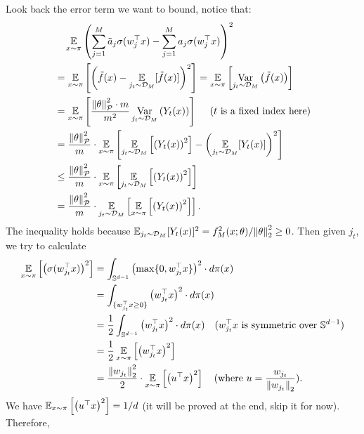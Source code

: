 \begin{answer}
    Look back the error term we want to bound, notice that:
    \begin{align*}
        &\quad \operatorname*{\mathbb{E}}_{x \sim \pi} \left( \sum_{j=1}^M \tilde{a}_j \sigma(w_j^{\top} x) - \sum_{j=1}^M a_j \sigma(w_j^{\top} x) \right)^2  \\
        &= \operatorname*{\mathbb{E}}_{x \sim \pi} \left[\left(\tilde{f}(x) - \operatorname*{\mathbb{E}}_{j_t \sim \mathcal{D}_M}[\tilde{f}(x)]\right)^2\right] = \operatorname*{\mathbb{E}}_{x \sim \pi} \left[\operatorname*{Var}_{j_t \sim \mathcal{D}_M}\left( \tilde{f}(x) \right)\right] \\
        &= \operatorname*{\mathbb{E}}_{x\sim \pi} \left[\frac{\norm{\theta}_\mathcal{P}^2 \cdot m}{m^2} \operatorname*{Var}_{j_t \sim \mathcal{D}_M}\left(Y_t(x)\right)\right] \quad \text{ ($t$ is a fixed index here)} \\
        &= \frac{\norm{\theta}_{\mathcal{P}}^2}{m} \cdot \operatorname*{\mathbb{E}}_{x\sim \pi} \left[\operatorname*{\mathbb{E}}_{j_t\sim \mathcal{D}_M}\left[\left(Y_t(x)\right)^2\right] - \left(\operatorname*{\mathbb{E}}_{j_t\sim \mathcal{D}_M} [Y_t(x)]\right)^2\right] \\
        &\le \frac{\norm{\theta}_{\mathcal{P}}^2}{m} \cdot \operatorname*{\mathbb{E}}_{x\sim \pi} \left[\operatorname*{\mathbb{E}}_{j_t\sim \mathcal{D}_M}\left[\left(Y_t(x)\right)^2\right]\right]  \\
        &= \frac{\norm{\theta}_{\mathcal{P}}^2}{m} \cdot  \operatorname*{\mathbb{E}}_{j_t\sim \mathcal{D}_M}\left[\operatorname*{\mathbb{E}}_{x\sim \pi}\left[\left(Y_t(x)\right)^2\right]\right].
    \end{align*}
    The inequality holds because $\operatorname*{\mathbb{E}}_{j_t\sim \mathcal{D}_M} [Y_t(x)]^2 = f^2_M(x; \theta) / \norm{\theta}_2^2 \ge 0$.
    Then given $j_t$, we try to calculate 
    \begin{align*}
        \operatorname*{\mathbb{E}}_{x\sim \pi}\left[\left(\sigma(w_{j_t}^\top x)\right)^2\right] &= \int_{\mathbb{S}^{d-1}} \left(\max\{0, w_{j_t}^\top x\}\right)^2 \cdot d\pi(x) \\
        &= \int_{\{w_{j_t}^\top x \ge 0\}} \left(w_{j_t}^\top x\right)^2 \cdot d\pi(x) \\
        &= \frac{1}{2} \int_{\mathbb{S}^{d-1}} \left(w_{j_t}^\top x\right)^2 \cdot d\pi(x) \quad \text{($w_{j_t}^\top x$ is symmetric over $\mathbb{S}^{d-1}$)} \\
        &= \frac{1}{2} \operatorname*{\mathbb{E}}_{x\sim \pi} \left[\left(w_{j_t}^\top x\right)^2\right] \\
        &= \frac{\norm{w_{j_t}}_2^2}{2} \cdot \operatorname*{\mathbb{E}}_{x\sim \pi} \left[\left(u^\top x\right)^2\right] \quad \text{(where $u = \frac{w_{j_t}}{\norm{w_{j_t}}_2}$)}.
    \end{align*}
    We have $\operatorname*{\mathbb{E}}_{x\sim \pi} \left[\left(u^\top x\right)^2\right] = 1/d$ (it will be proved at the end, skip it for now). Therefore,

\end{answer}
